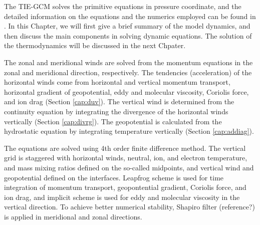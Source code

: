 The TIE-GCM solves the primitive equations in pressure coordinate, and the detailed information on
the equations and the numerics employed can be found in \cite{dickinson1981}. In this Chapter,
we will first give a brief summary of the model dynamics, and then discuss the main components
in solving dynamic equations. The solution of the thermodynamics will be discussed in the next
Chpater.

The zonal and meridional winds are solved from the momentum equations in the zonal and meridional
direction, respectively. The tendencies (acceleration) of the horizontal winds come from horizontal
and vertical momentum transport, horizontal gradient of geopotential, eddy and molecular viscosity,
Coriolis force, and ion drag (Section \ref{cap:duv}). The vertical wind is determined from the
continuity equation by integrating the divergence of the horizontal winds vertically (Section
\ref{cap:divrg}). The geopotential is calculated from the hydrostatic equation by integrating
temperature vertically (Section \ref{cap:addiag}).

The equations are solved using 4th order finite difference method. The vertical grid is staggered
with horizontal winds, neutral, ion, and electron temperature, and mass mixing ratios defined
on the so-called midpoints, and vertical wind and geopotential defined on the interfaces.
Leapfrog scheme is used for time integration of momentum transport, geopontential gradient,
Coriolis force, and ion drag, and implicit scheme is used for eddy and molecular viscosity
in the vertical direction. To achieve better numerical stability, Shapiro filter (reference?) is
applied in meridional and zonal directions.
